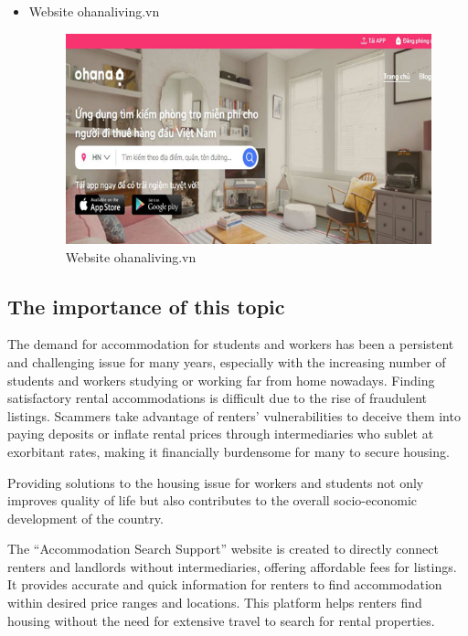 \documentclass[../Main.tex]{subfiles}
\begin{document}
\begin{itemize}
    \item Website ohanaliving.vn
          \begin{figure}[H]
              \centering
              \includegraphics[width=\textwidth]{Figure/Picture3.png}
              \caption{Website ohanaliving.vn}
              \label{fig:ohanaliving}
          \end{figure}
\end{itemize}

\subsection{The importance of this topic}

The demand for accommodation for students and workers has been a persistent and challenging issue for many years, especially with the increasing number of students and workers studying or working far from home nowadays.
Finding satisfactory rental accommodations is difficult due to the rise of fraudulent listings.
Scammers take advantage of renters' vulnerabilities to deceive them into paying deposits or inflate rental prices through intermediaries who sublet at exorbitant rates, making it financially burdensome for many to secure housing.

Providing solutions to the housing issue for workers and students not only improves quality of life but also contributes to the overall socio-economic development of the country.

The ``Accommodation Search Support'' website is created to directly connect renters and landlords without intermediaries, offering affordable fees for listings.
It provides accurate and quick information for renters to find accommodation within desired price ranges and locations.
This platform helps renters find housing without the need for extensive travel to search for rental properties.
\end{document}
